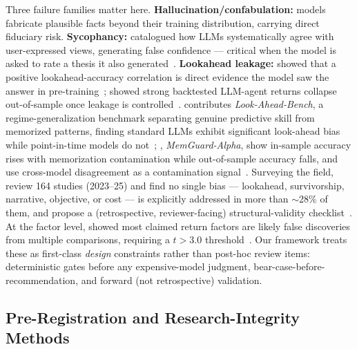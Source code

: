 \documentclass[11pt]{article}
\begin{document}
Three failure families matter here. \textbf{Hallucination/confabulation:}
models fabricate plausible facts beyond their training distribution, carrying
direct fiduciary risk. \textbf{Sycophancy:} \citet{malmqvist2024sycophancy}
catalogued how LLMs systematically agree with user-expressed views, generating
false confidence --- critical when the model is asked to rate a thesis it also
generated~\citep{malmqvist2024sycophancy}. \textbf{Lookahead leakage:}
\citet{gao2025lookaheadbias} showed that a positive lookahead-accuracy
correlation is direct evidence the model saw the answer in
pre-training~\citep{gao2025lookaheadbias}; \citet{li2025profitmirage} showed
strong backtested LLM-agent returns collapse out-of-sample once leakage is
controlled~\citep{li2025profitmirage}. \citet{benhenda2026lookaheadbench}
contributes \emph{Look-Ahead-Bench}, a regime-generalization benchmark
separating genuine predictive skill from memorized patterns, finding standard
LLMs exhibit significant look-ahead bias while point-in-time models do
not~\citep{benhenda2026lookaheadbench}; \citet{roy2026memguard},
\emph{MemGuard-Alpha}, show in-sample accuracy rises with memorization
contamination while out-of-sample accuracy falls, and use cross-model
disagreement as a contamination signal~\citep{roy2026memguard}. Surveying the
field, \citet{kong2026evaluating} review 164 studies (2023--25) and find no
single bias --- lookahead, survivorship, narrative, objective, or cost --- is
explicitly addressed in more than $\sim$28\% of them, and propose a
(retrospective, reviewer-facing) structural-validity
checklist~\citep{kong2026evaluating}. At the factor level,
\citet{harvey2016crosssection} showed most claimed return factors are likely
false discoveries from multiple comparisons, requiring a $t > 3.0$
threshold~\citep{harvey2016crosssection}. Our framework treats these as
first-class \emph{design} constraints rather than post-hoc review items:
deterministic gates before any expensive-model judgment,
bear-case-before-recommendation, and forward (not retrospective) validation.

\subsection{Pre-Registration and Research-Integrity Methods}
\end{document}
